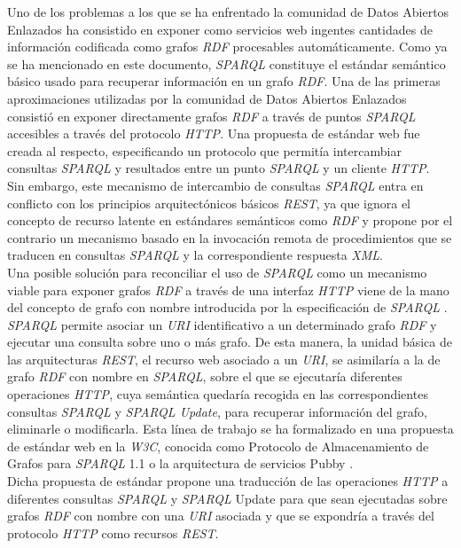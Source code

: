 Uno de los problemas a los que se ha enfrentado la comunidad de Datos Abiertos Enlazados  ha consistido en exponer como servicios web ingentes cantidades de informaci\'on codificada como grafos \textit{RDF} procesables autom\'aticamente. Como ya se ha mencionado en este documento, \textit{SPARQL} constituye el est\'andar sem\'antico b\'asico usado para recuperar informaci\'on en un grafo \textit{RDF}. Una de las primeras aproximaciones utilizadas por la comunidad de Datos Abiertos Enlazados consisti\'o en exponer directamente grafos \textit{RDF} a trav\'es de puntos \textit{SPARQL} accesibles a trav\'es del protocolo \textit{HTTP}. Una propuesta de est\'andar web fue creada al respecto, especificando un protocolo \cite{sparql_protocol} que permit\'ia intercambiar consultas \textit{SPARQL} y resultados entre un punto \textit{SPARQL} y un cliente \textit{HTTP}.\\
Sin embargo, este mecanismo de intercambio de consultas \textit{SPARQL} entra en conflicto con los principios arquitect\'onicos b\'asicos \textit{REST}, ya que ignora el concepto de recurso latente en est\'andares sem\'anticos como \textit{RDF} y propone por el contrario un mecanismo basado en la invocaci\'on remota de procedimientos que se traducen en consultas \textit{SPARQL} y la correspondiente respuesta \textit{XML}.\\
Una posible soluci\'on para reconciliar el uso de \textit{SPARQL} como un mecanismo viable para exponer grafos \textit{RDF} a trav\'es de una interfaz \textit{HTTP} viene de la mano del concepto de grafo con nombre introducida por la especificaci\'on de \textit{SPARQL} \cite{wilde2009restful}. \textit{SPARQL} permite asociar un \textit{URI} identificativo a un determinado grafo \textit{RDF} y ejecutar una consulta sobre uno o m\'as grafo. De esta manera, la unidad b\'asica de las arquitecturas \textit{REST}, el recurso web asociado a un \textit{URI}, se asimilar\'ia a la de grafo \textit{RDF} con nombre en \textit{SPARQL}, sobre el que se ejecutar\'ia diferentes operaciones \textit{HTTP}, cuya sem\'antica quedar\'ia recogida en las correspondientes consultas \textit{SPARQL} y \textit{SPARQL Update}, para recuperar informaci\'on del grafo, eliminarle o modificarla.
Esta l\'inea de trabajo se ha formalizado en una propuesta de est\'andar web en la \textit{W3C}, conocida como Protocolo de Almacenamiento de Grafos para \textit{SPARQL} 1.1 \cite{ogbuji2011sparql} o la arquitectura de servicios Pubby \cite{cyganiak2008pubby}.\\
Dicha propuesta de est\'andar propone una traducci\'on de las operaciones \textit{HTTP} a diferentes consultas \textit{SPARQL}  y \textit{SPARQL} Update para que sean ejecutadas sobre grafos \textit{RDF} con nombre con una \textit{URI} asociada y que se expondr\'ia a trav\'es del protocolo \textit{HTTP} como recursos \textit{REST}.\\
